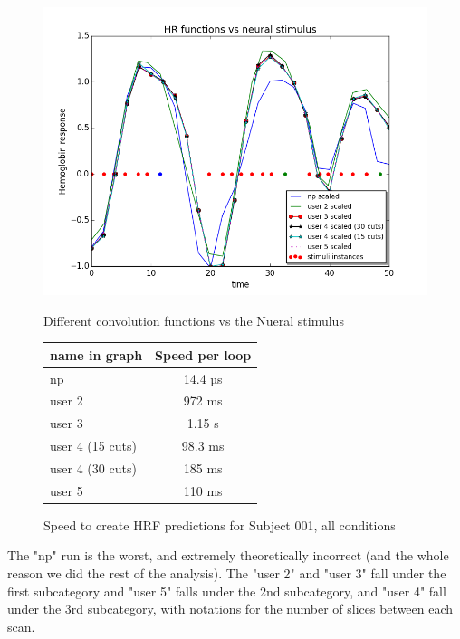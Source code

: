\begin{figure}[ht]
\centering
	\begin{minipage}[b]{0.45\linewidth}
		\centering
		\includegraphics[width=.8\linewidth]{images/convolution_vs_neural_stimulus}  
		\caption{\scriptsize{Different convolution functions vs the Nueral stimulus}}
		\label{fig:convolution}

	\end{minipage}
\quad
	\begin{minipage}[b]{0.45\linewidth}
		\centering
		\begin{tabular}{|l | c|}
		\hline
		name in graph & Speed per loop \\
		\hline
		np    			 & 14.4 µs \\
		user 2     		 & 972 ms  \\
		user 3     		 & 1.15 s  \\
		user 4 (15 cuts) & 98.3 ms \\
		user 4 (30 cuts) & 185 ms  \\
		user 5     	 	 & 110 ms  \\
		\hline
		\end{tabular}
		\vspace{5mm}
		\caption{\scriptsize{Speed to create HRF predictions for Subject 001, all conditions}}
		\label{table:convolution}
	\end{minipage}
\end{figure}

The "np" run is the worst, and extremely theoretically incorrect (and the whole reason we did the rest of the analysis). The "user 2" and "user 3" fall under the first subcategory and  "user 5" falls under the 2nd subcategory, and "user 4" fall under the 3rd subcategory, with notations for the number of slices between each scan.



